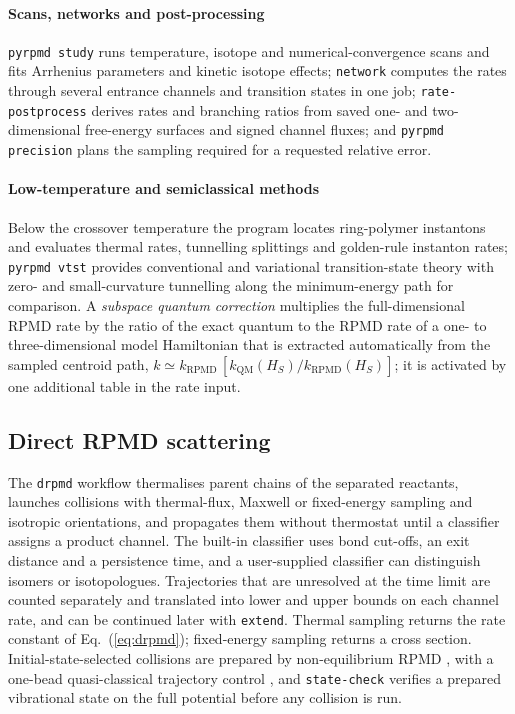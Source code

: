 \documentclass[preprint,12pt]{elsarticle}
\newcommand{\code}[1]{\texttt{#1}}
\begin{document}
\paragraph{Scans, networks and post-processing} \code{pyrpmd study} runs temperature, isotope and numerical-convergence scans and fits Arrhenius parameters and kinetic isotope effects; \code{network} computes the rates through several entrance channels and transition states in one job; \code{rate-postprocess} derives rates and branching ratios from saved one- and two-dimensional free-energy surfaces and signed channel fluxes; and \code{pyrpmd precision} plans the sampling required for a requested relative error.

\paragraph{Low-temperature and semiclassical methods} Below the crossover temperature the program locates ring-polymer instantons \cite{rpi09,rpi16} and evaluates thermal rates, tunnelling splittings \cite{split11} and golden-rule instanton rates; \code{pyrpmd vtst} provides conventional and variational transition-state theory with zero- and small-curvature tunnelling along the minimum-energy path for comparison. A \emph{subspace quantum correction} multiplies the full-dimensional RPMD rate by the ratio of the exact quantum to the RPMD rate of a one- to three-dimensional model Hamiltonian that is extracted automatically from the sampled centroid path, $k\simeq k_{\mathrm{RPMD}}\,[k_{\mathrm{QM}}(H_S)/k_{\mathrm{RPMD}}(H_S)]$; it is activated by one additional table in the rate input.

\subsection{Direct RPMD scattering}

The \code{drpmd} workflow thermalises parent chains of the separated reactants, launches collisions with thermal-flux, Maxwell or fixed-energy sampling and isotropic orientations, and propagates them without thermostat until a classifier assigns a product channel. The built-in classifier uses bond cut-offs, an exit distance and a persistence time, and a user-supplied classifier can distinguish isomers or isotopologues. Trajectories that are unresolved at the time limit are counted separately and translated into lower and upper bounds on each channel rate, and can be continued later with \code{extend}. Thermal sampling returns the rate constant of Eq.~(\ref{eq:drpmd}); fixed-energy sampling returns a cross section. Initial-state-selected collisions are prepared by non-equilibrium RPMD \cite{nerp16,state20}, with a one-bead quasi-classical trajectory control \cite{qct65}, and \code{state-check} verifies a prepared vibrational state on the full potential before any collision is run.
\end{document}
